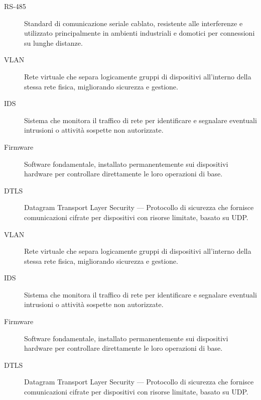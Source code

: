 \begin{description}
    \item[RS-485] Standard di comunicazione seriale cablato, resistente alle interferenze e utilizzato principalmente in ambienti industriali e domotici per connessioni su lunghe distanze.
    \item[VLAN] Rete virtuale che separa logicamente gruppi di dispositivi all'interno della stessa rete fisica, migliorando sicurezza e gestione.
    \item[IDS] Sistema che monitora il traffico di rete per identificare e segnalare eventuali intrusioni o attività sospette non autorizzate.
    \item[Firmware] Software fondamentale, installato permanentemente sui dispositivi hardware per controllare direttamente le loro operazioni di base.
    \item[DTLS] Datagram Transport Layer Security --- Protocollo di sicurezza che fornisce comunicazioni cifrate per dispositivi con risorse limitate, basato su UDP.
    \item[VLAN] Rete virtuale che separa logicamente gruppi di dispositivi all'interno della stessa rete fisica, migliorando sicurezza e gestione.
    \item[IDS] Sistema che monitora il traffico di rete per identificare e segnalare eventuali intrusioni o attività sospette non autorizzate.
    \item[Firmware] Software fondamentale, installato permanentemente sui dispositivi hardware per controllare direttamente le loro operazioni di base.
    \item[DTLS] Datagram Transport Layer Security --- Protocollo di sicurezza che fornisce comunicazioni cifrate per dispositivi con risorse limitate, basato su UDP.
\end{description}